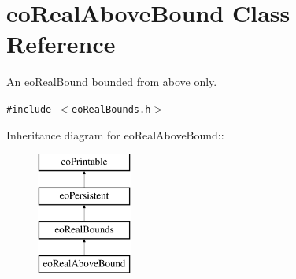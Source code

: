 \section{eo\-Real\-Above\-Bound Class Reference}
\label{classeo_real_above_bound}
An eo\-Real\-Bound bounded from above only.  


{\tt \#include $<$eo\-Real\-Bounds.h$>$}

Inheritance diagram for eo\-Real\-Above\-Bound::\begin{figure}[H]
\begin{center}
\leavevmode
\includegraphics[height=4cm]{classeo_real_above_bound}
\end{center}
\end{figure}
